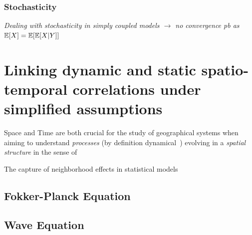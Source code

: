 \subsubsection{Stochasticity}

\textit{Dealing with stochasticity in simply coupled models $\rightarrow$ no convergence pb as $\operatorname{\mathbb{E}}\!\left[X\right]=\operatorname{\mathbb{E}}\!\left[\operatorname{\mathbb{E}}\!\left[X|Y\right]\right]$}














\newpage



\section[Spatio-temporal Correlations]{Linking dynamic and static spatio-temporal correlations under simplified assumptions}


Space and Time are both crucial for the study of geographical systems when aiming to understand \emph{processes} (by definition dynamical~\cite{hypergeo}) evolving in a \emph{spatial structure} in the sense of~\cite{dollfus1975some}


The capture of neighborhood effects in statistical models 


\subsection{Fokker-Planck Equation}



\subsection{Wave Equation}









